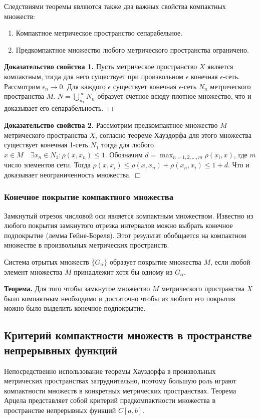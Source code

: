 \documentclass[14pt,a4paper]{extarticle}
\theoremstyle{definition}
\theoremstyle{remark}
\newcommand{\be}{\begin{enumerate}}
\newcommand{\ee}{\end{enumerate}}
\renewcommand{\[}{\begin{dmath*}[compact]}
\renewcommand{\]}{\end{dmath*}}
\newcommand{\tth}[1][]{\textbf{Теорема#1.}}
\newcommand{\btev}[1][]{\textbf{Доказательство#1.}
}
\newcommand{\etev}{$\Box$}
\begin{document}
Следствиями теоремы являются также два важных свойства компактных множеств:

\be
  \item Компактное метрическое пространство сепарабельное.
  \item Предкомпактное множество любого метрического пространства ограничено.
\ee

\btev[ свойства 1] Пусть метрическое пространство $X$ является компактным, тогда для него существует при произвольном $\epsilon$ конечная $\epsilon$-сеть. Рассмотрим $\epsilon_n \to 0$. Для каждого $\epsilon$ существует конечная $\epsilon$-сеть $N_n$ метрического пространства $M$. $N=\bigcup _{n_1}^{\infty} N_n$ образует счетное всюду плотное множество, что и доказывает его сепарабельность. \etev

\btev[ свойства 2] Рассмотрим предкомпактное множество $M$ метрического пространства $X$, согласно теореме Хауздорфа для этого множества существует конечная 1-сеть $N_1$ тогда для любого $x \in M\quad \exists x_n \in N_1: \rho(x, x_n) \leq 1$. Обозначим $d=\max_{n=1,2,\dots,m}\rho(x_i,x)$, где $m$ число элементов сети. Тогда $\rho(x, x_i) \leq \rho(x, x_n)+\rho(x_n, x_i) \leq 1+d$. Что и доказывает неограниченность множества. \etev

\subsubsection{Конечное покрытие компактного множества}

Замкнутый отрезок числовой оси является компактным множеством. Известно из любого покрытия замкнутого отрезка интервалов можно выбрать конечное подпокрытие (лемма Гейне-Бореля). Этот результат обобщается на компактном множестве в произвольных метрических пространств.

Система отрытых множеств $\{G_\alpha\}$ образует покрытие множества $M$, если любой элемент множества $M$ принадлежит хотя бы одному из $G_\alpha$.

\tth[] Для того чтобы замкнутое множество $M$ метрического пространства $X$ было компактным необходимо и достаточно чтобы из любого его покрытия можно было выделить конечное подпокрытие.

\subsection{Критерий компактности множеств в пространстве непрерывных функций}

Непосредственно использование теоремы Хауздорфа в произвольных метрических пространствах затруднительно, поэтому большую роль играют компактности множеств в конкретных метрических пространствах. Теорема Арцела представляет собой критерий предкомпактности множества в пространстве непрерывных функций $C[a,b]$.
\end{document}

